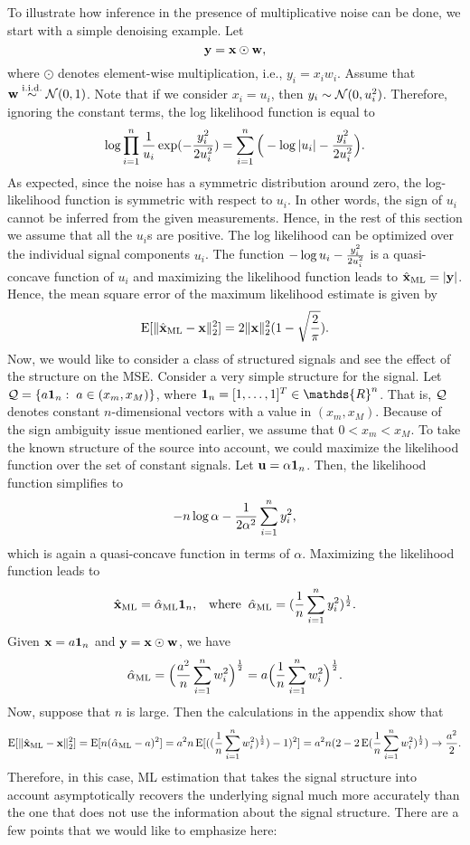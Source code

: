 \documentclass[onecolumn]{IEEEtran}
\newcommand{\wv}{{\bf w}}
\newcommand{\xvh}{\hat{\xv}}
\begin{document}
To illustrate how inference in the presence of multiplicative noise can be done, we start with a simple denoising example.  Let 
\[
\yv=\xv\odot \wv,
\]
where $\odot$ denotes element-wise multiplication, i.e., $y_i=x_iw_i$. Assume that $\wv\stackrel{\rm i.i.d.}{\sim}\Nc(0,1)$.  Note that if we consider $x_i=u_i$, then $y_i\sim\mathcal{N}(0,u_i^2)$. Therefore, ignoring the constant terms, the log likelihood function is equal to
\[
\log \prod_{i=1}^n{1\over u_i}\exp(-{y_i^2\over 2u_i^2})=\sum_{i=1}^n\Big(-\log |u_i|-{y_i^2\over 2 u_i^2}\Big). 
\]
As expected, since the noise has a symmetric distribution around zero, the log-likelihood function is symmetric with respect to $u_i$. In other words, the sign of $u_i$ cannot be inferred from the given measurements. Hence, in the rest of this section we assume that all the $u_i$s are positive. The log likelihood can be optimized over the individual signal components $u_i$. The function $-\log u_i-{y_i^2\over 2 u_i^2}$ is a quasi-concave function of $u_i$ and  maximizing the likelihood function leads to $\xvh_{\rm ML}=|\yv|$. Hence, the mean square error of the maximum likelihood estimate is given by
\begin{equation}\label{eq:power_denoising}
\E[ \|\xvh_{\rm ML}-\xv\|_2^2] = 2\|\xv\|_2^2  (1 - \sqrt{\frac{2}{\pi}}). 
\end{equation}
Now, we would like to consider a class of structured signals and see the effect of the structure on the MSE. Consider a very simple structure for the signal. Let $\mathcal{Q}=\{a{\bf 1}_n:\; a\in(x_m,x_M)\}$, where ${\bf 1}_n=[1,\ldots,1]^T\in\mathds{R}^n$.  That is,  $\mathcal{Q}$ denotes constant $n$-dimensional vectors with a value in $(x_m,x_M)$. Because of the sign ambiguity issue mentioned earlier,  we assume that $0<x_m<x_M$. To take the  known structure of the source into account, we could maximize the likelihood function over the set of constant signals. Let ${\bf u}=\alpha {\bf 1}_n$. Then, the likelihood function simplifies to
\[
-n\log \alpha-{1\over 2\alpha^2}\sum_{i=1}^ny_i^2,
\]
which is again a quasi-concave function in terms of $\alpha$. Maximizing the likelihood function leads to
\[
\xvh_{\rm ML}=\hat{\alpha}_{\rm ML} {\bf 1}_n, \;\;\;{\rm where}\;\; \hat{\alpha}_{\rm ML}=({1\over n}\sum_{i=1}^ny_i^2)^{1\over 2}.
\]
Given ${\bf x}=a{\bf 1}_n$ and $\yv=\xv\odot \wv$, we have
\begin{align*}
\hat{\alpha}_{\rm ML}=\Big({a^2\over n}\sum_{i=1}^nw_i^2 \Big)^{1\over 2}=a \Big({1\over n}\sum_{i=1}^nw_i^2\Big)^{1\over 2}.
\end{align*}
Now, suppose that $n$ is large. Then the calculations in the appendix show that 
\[
\E[ \|\xvh_{\rm ML}- \xv\|_2^2] = \E [n (\hat{\alpha}_{\rm ML}-a)^2] = a^2 n \E[ ( ({1\over n}\sum_{i=1}^nw_i^2)^{1\over 2})-1)^2 ]= a^2 n (2- 2 \E  ({1\over n}\sum_{i=1}^nw_i^2)^{1\over 2}) \rightarrow \frac{a^2}{2}. 
\]
Therefore, in this case,  ML estimation that takes the signal structure into account asymptotically recovers the underlying signal much more accurately than the one that does not use the information about the signal  structure. There are a few points that we would like to emphasize here:
\end{document}
